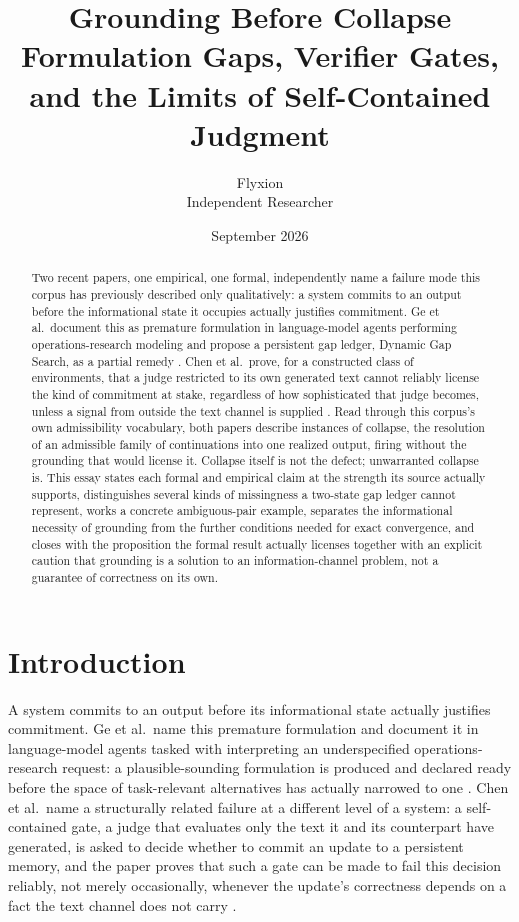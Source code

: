 \documentclass[11pt]{article}
\title{\textbf{Grounding Before Collapse}\\[4pt]
\large Formulation Gaps, Verifier Gates, and the Limits of Self-Contained Judgment}
\author{Flyxion \\ \small Independent Researcher}
\date{September 2026}
\begin{document}
\maketitle

\begin{abstract}
\noindent Two recent papers, one empirical, one formal, independently name a failure mode this corpus has previously described only qualitatively: a system commits to an output before the informational state it occupies actually justifies commitment. Ge et al.\ document this as premature formulation in language-model agents performing operations-research modeling and propose a persistent gap ledger, Dynamic Gap Search, as a partial remedy \cite{ge2026ask}. Chen et al.\ prove, for a constructed class of environments, that a judge restricted to its own generated text cannot reliably license the kind of commitment at stake, regardless of how sophisticated that judge becomes, unless a signal from outside the text channel is supplied \cite{chen2026bilevel}. Read through this corpus's own admissibility vocabulary, both papers describe instances of collapse, the resolution of an admissible family of continuations into one realized output, firing without the grounding that would license it. Collapse itself is not the defect; unwarranted collapse is. This essay states each formal and empirical claim at the strength its source actually supports, distinguishes several kinds of missingness a two-state gap ledger cannot represent, works a concrete ambiguous-pair example, separates the informational necessity of grounding from the further conditions needed for exact convergence, and closes with the proposition the formal result actually licenses together with an explicit caution that grounding is a solution to an information-channel problem, not a guarantee of correctness on its own.
\end{abstract}

\section{Introduction}

A system commits to an output before its informational state actually justifies commitment. Ge et al.\ name this premature formulation and document it in language-model agents tasked with interpreting an underspecified operations-research request: a plausible-sounding formulation is produced and declared ready before the space of task-relevant alternatives has actually narrowed to one \cite{ge2026ask}. Chen et al.\ name a structurally related failure at a different level of a system: a self-contained gate, a judge that evaluates only the text it and its counterpart have generated, is asked to decide whether to commit an update to a persistent memory, and the paper proves that such a gate can be made to fail this decision reliably, not merely occasionally, whenever the update's correctness depends on a fact the text channel does not carry \cite{chen2026bilevel}.
\end{document}
